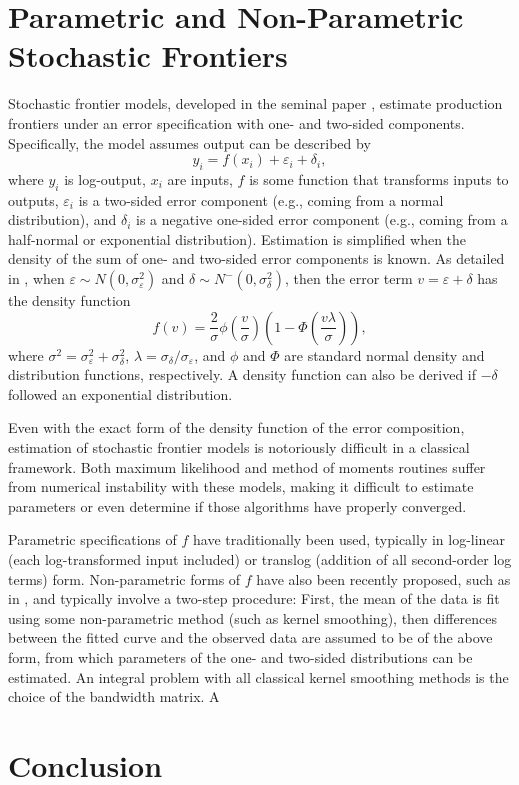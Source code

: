 \documentclass[twocolumn]{article}
\newcommand{\ep}{\varepsilon}
\begin{document}
\section{Parametric and Non-Parametric Stochastic Frontiers}

\label{sec:SF}

Stochastic frontier models, developed in the seminal paper \cite{AignerLovellSchmidt}, estimate production frontiers under an error specification with one- and two-sided components. Specifically, the model assumes output can be described by
\begin{equation}
	y_i = f(x_i) + \ep_i + \delta_i,
\end{equation}
where $y_i$ is log-output, $x_i$ are inputs, $f$ is some function that transforms inputs to outputs, $\ep_i$ is a two-sided error component (e.g., coming from a normal distribution), and $\delta_i$ is a negative one-sided error component (e.g., coming from a half-normal or exponential distribution). Estimation is simplified when the density of the sum of one- and two-sided error components is known. As detailed in \cite{AignerLovellSchmidt}, when $\ep\sim N(0, \sigma_\ep^2)$ and $\delta\sim N^-(0, \sigma_\delta^2)$, then the error term $v = \ep + \delta$ has the density function
\begin{equation}
	f(v) = \frac2\sigma \phi\left(\frac{v}\sigma\right)\left(1 - \Phi\left(\frac{v\lambda}{\sigma}\right)\right),
\end{equation}
where $\sigma^2 = \sigma_\ep^2 + \sigma_\delta^2$, $\lambda = \sigma_\delta / \sigma_\ep$, and $\phi$ and $\Phi$ are standard normal density and distribution functions, respectively. A density function can also be derived if $-\delta$ followed an exponential distribution.

Even with the exact form of the density function of the error composition, estimation of stochastic frontier models is notoriously difficult in a classical framework. Both maximum likelihood and method of moments routines suffer from numerical instability with these models, making it difficult to estimate parameters or even determine if those algorithms have properly converged. 

Parametric specifications of $f$ have traditionally been used, typically in log-linear (each log-transformed input included) or translog (addition of all second-order log terms) form. Non-parametric forms of $f$ have also been recently proposed, such as in \cite{ParmeterRacine}, and typically involve a two-step procedure: First, the mean of the data is fit using some non-parametric method (such as kernel smoothing), then differences between the fitted curve and the observed data are assumed to be of the above form, from which parameters of the one- and two-sided distributions can be estimated. An integral problem with all classical kernel smoothing methods is the choice of the bandwidth matrix. A 

\section{Conclusion}



\end{document}
